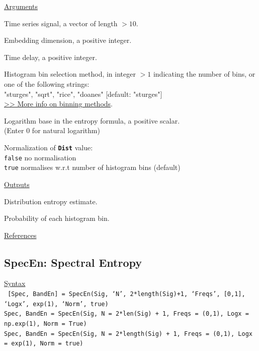 \documentclass[12pt, a4paper, titlepage, openany]{book}
\begin{document}
\noindent \ul{Arguments}
\begin{description}[labelsep=1cm, labelwidth=2cm, nosep, style=multiline,leftmargin=3cm]\footnotesize
\item[\texttt{Sig}]		Time series signal, a vector of length $> 10$.
\item[\texttt{m}]		Embedding dimension, a positive integer.
\item[\texttt{tau}]		Time delay, a positive integer.
\item[\texttt{Bins}]	Histogram bin selection method, in integer $> 1$ indicating the number of bins, 
						or one of the following strings:\\
   					    "sturges", "sqrt", "rice", "doanes" \hspace{2em} [default: "sturges"]				    
\\ \href{https://en.wikipedia.org/wiki/Histogram#Number_of_bins_and_width}{>> More info on binning methods}.
\item[\texttt{Logx}]	Logarithm base in the entropy formula, a positive scalar.\\
						(Enter 0 for natural logarithm)
\item[\texttt{Norm}]	Normalization of \texttt{\textbf{Dist}} value:\\
		  \texttt{false} \hspace{10pt} no normalisation \\
		  \texttt{true} \hspace{15pt} normalises w.r.t number of histogram bins (default)
\end{description}

\noindent \ul{Outputs}
\begin{description}[labelsep=1cm, labelwidth=2cm, nosep, style=multiline,leftmargin=3cm]\footnotesize
\item[\texttt{Dist}]		Distribution entropy estimate.
\item[\texttt{Phi}]		Probability of each histogram bin.
\end{description}

\noindent \ul{References}\hspace{1cm}
\cite{Dist1}



\newpage
\subsection{\normalsize SpecEn: \hspace{15mm} Spectral Entropy} \label{SpecEn}
\noindent\ul{Syntax} \vspace{6mm} \\ \noindent \texttt{\footnotesize
[Spec, BandEn] = SpecEn(Sig, ‘N’, 2*length(Sig)+1, ‘Freqs’, [0,1], ‘Logx’, exp(1), ‘Norm’, true)\\
 Spec, BandEn  = SpecEn(Sig, N = 2*len(Sig) + 1, Freqs = (0,1), Logx = np.exp(1), Norm = True)\\ 
 Spec, BandEn  = SpecEn(Sig, N = 2*length(Sig) + 1, Freqs = (0,1), Logx = exp(1), Norm = true)}
\end{document}
